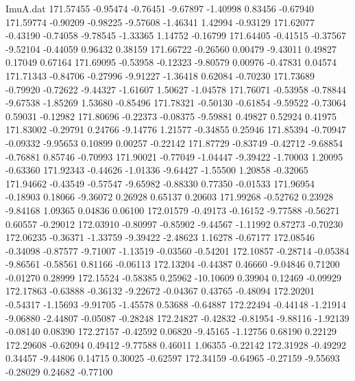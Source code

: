 \begin{filecontents}{ImuA.dat}
 171.57455   -0.95474   -0.76451   -9.67897   -1.40998    0.83456   -0.67940
 171.59774   -0.90209   -0.98225   -9.57608   -1.46341    1.42994   -0.93129
 171.62077   -0.43190   -0.74058   -9.78545   -1.33365    1.14752   -0.16799
 171.64405   -0.41515   -0.37567   -9.52104   -0.44059    0.96432    0.38159
 171.66722   -0.26560    0.00479   -9.43011    0.49827    0.17049    0.67164
 171.69095   -0.53958   -0.12323   -9.80579    0.00976   -0.47831    0.04574
 171.71343   -0.84706   -0.27996   -9.91227   -1.36418    0.62084   -0.70230
 171.73689   -0.79920   -0.72622   -9.44327   -1.61607    1.50627   -1.04578
 171.76071   -0.53958   -0.78844   -9.67538   -1.85269    1.53680   -0.85496
 171.78321   -0.50130   -0.61854   -9.59522   -0.73064    0.59031   -0.12982
 171.80696   -0.22373   -0.08375   -9.59881    0.49827    0.52924    0.41975
 171.83002   -0.29791    0.24766   -9.14776    1.21577   -0.34855    0.25946
 171.85394   -0.70947   -0.09332   -9.95653    0.10899    0.00257   -0.22142
 171.87729   -0.83749   -0.42712   -9.68854   -0.76881    0.85746   -0.70993
 171.90021   -0.77049   -1.04447   -9.39422   -1.70003    1.20095   -0.63360
 171.92343   -0.44626   -1.01336   -9.64427   -1.55500    1.20858   -0.32065
 171.94662   -0.43549   -0.57547   -9.65982   -0.88330    0.77350   -0.01533
 171.96954   -0.18903    0.18066   -9.36072    0.26928    0.65137    0.20603
 171.99268   -0.52762    0.23928   -9.84168    1.09365    0.04836    0.06100
 172.01579   -0.49173   -0.16152   -9.77588   -0.56271    0.60557   -0.29012
 172.03910   -0.80997   -0.85902   -9.44567   -1.11992    0.87273   -0.70230
 172.06235   -0.36371   -1.33759   -9.39422   -2.48623    1.16278   -0.67177
 172.08546   -0.34098   -0.87577   -9.71007   -1.13519   -0.03560   -0.54201
 172.10857   -0.28714   -0.05384   -9.86561   -0.58561    0.81166   -0.06113
 172.13204   -0.44387    0.46660   -9.04846    0.71200   -0.01270    0.28999
 172.15524   -0.58385    0.25962  -10.10609    0.39904    0.12469   -0.09929
 172.17863   -0.63888   -0.36132   -9.22672   -0.04367    0.43765   -0.48094
 172.20201   -0.54317   -1.15693   -9.91705   -1.45578    0.53688   -0.64887
 172.22494   -0.44148   -1.21914   -9.06880   -2.44807   -0.05087   -0.28248
 172.24827   -0.42832   -0.81954   -9.88116   -1.92139   -0.08140    0.08390
 172.27157   -0.42592    0.06820   -9.45165   -1.12756    0.68190    0.22129
 172.29608   -0.62094    0.49412   -9.77588    0.46011    1.06355   -0.22142
 172.31928   -0.49292    0.34457   -9.44806    0.14715    0.30025   -0.62597
 172.34159   -0.64965   -0.27159   -9.55693   -0.28029    0.24682   -0.77100

\end{filecontents}
